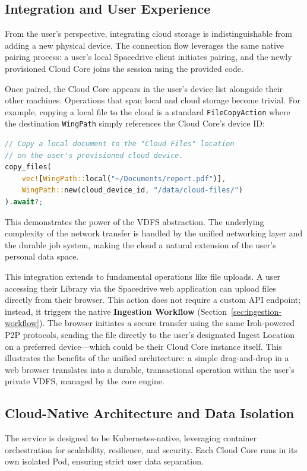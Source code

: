 \documentclass[sigconf]{acmart}
\begin{document}
\subsection{Integration and User Experience}
From the user's perspective, integrating cloud storage is indistinguishable from adding a new physical device. The connection flow leverages the same native pairing process: a user's local Spacedrive client initiates pairing, and the newly provisioned Cloud Core joins the session using the provided code.

Once paired, the Cloud Core appears in the user's device list alongside their other machines. Operations that span local and cloud storage become trivial. For example, copying a local file to the cloud is a standard \texttt{FileCopyAction} where the destination \texttt{WingPath} simply references the Cloud Core's device ID:

\begin{lstlisting}[language=Rust, caption={A cross-device copy to the cloud uses the same native operation}]
// Copy a local document to the "Cloud Files" location
// on the user's provisioned cloud device.
copy_files(
    vec![WingPath::local("~/Documents/report.pdf")],
    WingPath::new(cloud_device_id, "/data/cloud-files/")
).await?;
\end{lstlisting}

This demonstrates the power of the VDFS abstraction. The underlying complexity of the network transfer is handled by the unified networking layer and the durable job system, making the cloud a natural extension of the user's personal data space.

This integration extends to fundamental operations like file uploads. A user accessing their Library via the Spacedrive web application can upload files directly from their browser. This action does not require a custom API endpoint; instead, it triggers the native \textbf{Ingestion Workflow} (Section~\ref{sec:ingestion-workflow}). The browser initiates a secure transfer using the same Iroh-powered P2P protocols, sending the file directly to the user's designated Ingest Location on a preferred device—which could be their Cloud Core instance itself. This illustrates the benefits of the unified architecture: a simple drag-and-drop in a web browser translates into a durable, transactional operation within the user's private VDFS, managed by the core engine.

\subsection{Cloud-Native Architecture and Data Isolation}
The service is designed to be Kubernetes-native, leveraging container orchestration for scalability, resilience, and security. Each Cloud Core runs in its own isolated Pod, ensuring strict user data separation.
\end{document}
